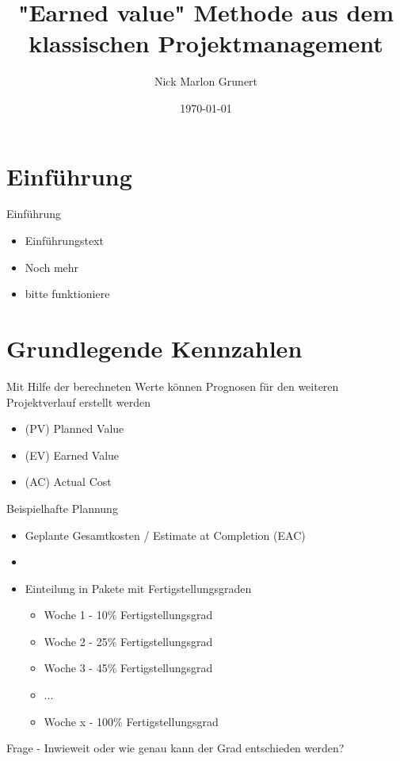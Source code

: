 \documentclass{f4_beamer}
\title{"Earned value" Methode aus dem klassischen Projektmanagement}
\author{Nick Marlon Grunert}
\date{\today}
\begin{document}
\section{Einführung}

\begin{frame}{Einführung}
    \begin{itemize}
        \item Einführungstext
        \item Noch mehr
        \item bitte funktioniere
    \end{itemize}
\end{frame}





\section{Grundlegende Kennzahlen}
\begin{frame}[fragile]
    Mit Hilfe der berechneten Werte können Prognosen für den weiteren Projektverlauf erstellt werden
    \begin{itemize}
        \item (PV) Planned Value
        \item (EV) Earned Value
        \item (AC) Actual Cost
    \end{itemize}
\end{frame}
\begin{frame}[fragile]
    \begin{center}
        \LARGE Beispielhafte Plannung
    \end{center}
    \begin{itemize}
        \item Geplante Gesamtkosten / Estimate at Completion (EAC)
        \item[]
        \item Einteilung in Pakete mit Fertigstellungsgraden
        \begin{itemize}
            \item Woche 1 - 10\% Fertigstellungsgrad
            \item Woche 2 - 25\% Fertigstellungsgrad
            \item Woche 3 - 45\% Fertigstellungsgrad
            \item ...
            \item Woche x - 100\% Fertigstellungsgrad
        \end{itemize}
    \end{itemize}
\end{frame}
\begin{frame}[fragile]
    \huge
    Frage - Inwieweit oder wie genau kann der Grad entschieden werden?
\end{frame}
\end{document}
